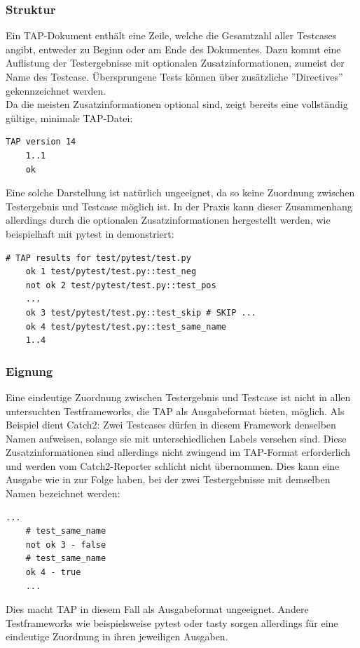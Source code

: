 \subsubsection{Struktur}
Ein TAP-Dokument enthält eine Zeile, welche die Gesamtzahl aller Testcases angibt, entweder zu Beginn oder am Ende des Dokumentes. Dazu kommt eine Auflistung der Testergebnisse mit optionalen Zusatzinformationen, zumeist der Name des Testcase. Übersprungene Tests können über zusätzliche ''Directives'' gekennzeichnet werden.\\
Da die meisten Zusatzinformationen optional sind, zeigt  bereits eine vollständig gültige, minimale TAP-Datei:
\begin{lstlisting}[caption={Minimales TAP-Beispiel}, label={TAPmin}]
    TAP version 14
    1..1
    ok
\end{lstlisting}
Eine solche Darstellung ist natürlich ungeeignet, da so keine Zuordnung zwischen Testergebnis und Testcase möglich ist. In der Praxis kann dieser Zusammenhang allerdings durch die optionalen Zusatzinformationen hergestellt werden, wie beispielhaft mit pytest in  demonstriert:

\begin{lstlisting}[caption={TAP, erzeugt durch pytest.\\ ''\textellipsis{}'' bezeichnet gekürzte Stellen.}, label={TAPpy}]
    # TAP results for test/pytest/test.py
    ok 1 test/pytest/test.py::test_neg
    not ok 2 test/pytest/test.py::test_pos
    ...
    ok 3 test/pytest/test.py::test_skip # SKIP ...
    ok 4 test/pytest/test.py::test_same_name
    1..4
\end{lstlisting}

\subsubsection{Eignung}
Eine eindeutige Zuordnung zwischen Testergebnis und Testcase ist nicht in allen untersuchten Testframeworks, die TAP als Ausgabeformat bieten, möglich. Als Beispiel dient Catch2: Zwei Testcases dürfen in diesem Framework denselben Namen aufweisen, solange sie mit unterschiedlichen Labels versehen sind. Diese Zusatzinformationen sind allerdings nicht zwingend im TAP-Format erforderlich und werden vom Catch2-Reporter schlicht nicht übernommen. Dies kann eine Ausgabe wie in  zur Folge haben, bei der zwei Testergebnisse mit demselben Namen bezeichnet werden:
\begin{lstlisting}[caption={TAP, erzeugt durch catch2.\\ ''\textellipsis{}'' bezeichnet gekürzte Stellen.}, label={TAPcatch2}]
    ...
    # test_same_name
    not ok 3 - false
    # test_same_name
    ok 4 - true
    ...
\end{lstlisting}
Dies macht TAP in diesem Fall als Ausgabeformat ungeeignet. Andere Testframeworks wie beispielsweise pytest oder tasty sorgen allerdings für eine eindeutige Zuordnung in ihren jeweiligen Ausgaben. 

